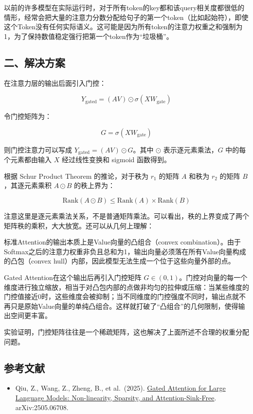 以前的许多模型在实际运行时，对于所有token的key都和该query相关度都很低的情形，经常会把大量的注意力分数分配给句子的第一个token（比如起始符），即使这个Token没有任何实际语义。这可能是因为所有token的注意力权重之和强制为1，为了保持数值稳定强行把第一个token作为``垃圾桶''。

\hypertarget{ux4e8cux89e3ux51b3ux65b9ux6848-1}{%
\subsection{二、解决方案}\label{ux4e8cux89e3ux51b3ux65b9ux6848-1}}

在注意力层的输出后面引入门控：

\[
Y_{\mathrm{gated}}=(AV)\odot\sigma(XW_{\mathrm{gate}})
\]

令门控矩阵为：

\[
G=\sigma(XW_{\mathrm{gate}})
\]

则门控注意力可以写成 \(Y_{\mathrm{gated}}=(AV)\odot G\)。其中 \(\odot\) 表示逐元素乘法，\(G\) 中的每个元素都由输入 \(X\) 经过线性变换和 sigmoid 函数得到。

根据 Schur Product Theorem 的推论，对于秩为 \(r_1\) 的矩阵 \(A\) 和秩为 \(r_2\) 的矩阵 \(B\)，其逐元素乘积 \(A\odot B\) 的秩上界为：

\[
\mathrm{Rank}(A\odot B)\le \mathrm{Rank}(A)\times \mathrm{Rank}(B)
\]

注意这里是逐元素乘法关系，不是普通矩阵乘法。可以看出，秩的上界变成了两个矩阵秩的乘积，大大放宽。还可以从几何上理解：

标准Attention的输出本质上是Value向量的凸组合（convex combination）。由于Softmax之后的注意力权重非负且总和为1，输出向量必须落在所有Value向量构成的凸包（convex hull）内部，因此模型无法生成一个位于这些向量外部的点。

Gated Attention在这个输出后再引入门控矩阵 \(G\in(0,1)\)。门控对向量的每一个维度进行独立缩放，相当于对凸包内部的点做非均匀的拉伸或压缩：当某些维度的门控值接近0时，这些维度会被抑制；当不同维度的门控强度不同时，输出点就不再只是原始Value向量的单纯凸组合。这样就打破了``凸组合''的几何限制，使得输出空间更丰富。

实验证明，门控矩阵往往是一个稀疏矩阵，这也解决了上面所述不合理的权重分配问题。

\FloatBarrier
{}
\hypertarget{ux53c2ux8003ux6587ux732e-100}{%
\subsection{参考文献}\label{ux53c2ux8003ux6587ux732e-100}}

\vspace{0.25em}
\begin{itemize}
\tightlist
\item
  Qiu, Z., Wang, Z., Zheng, B., et al.~(2025). \href{https://arxiv.org/abs/2505.06708}{Gated Attention for Large Language Models: Non-linearity, Sparsity, and Attention-Sink-Free}. arXiv:2505.06708.
\end{itemize}

\clearpage
